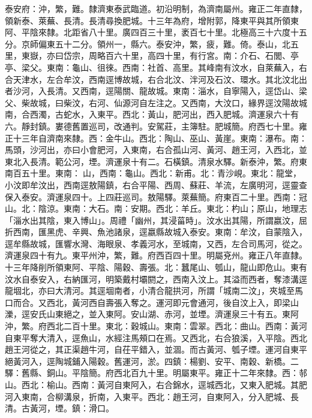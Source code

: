 \begin{pinyinscope}
泰安府：沖，繁，難。隸濟東泰武臨道。初沿明制，為濟南屬州。雍正二年直隸，領新泰、萊蕪、長清。長清尋換肥城。十三年為府，增附郭，降東平與其所領東阿、平陰來隸。北距省八十里。廣四百三十里，袤百七十里。北極高三十六度十五分。京師偏東五十二分。領州一，縣六。泰安沖，繁，疲，難。倚。泰山，北五里，東嶽，亦曰岱宗，周略百六十里，高四十里，有行宮。南：介石、石閭、亭亭、梁父。東南：龜山、徂徠。西南：社首、高里。其峰南有汶水，自萊蕪入，右合天津水，左合牟汶，西南逕博故城，右合北汶、泮河及石汶、環水。其北汶北出者沙河，入長清。又西南，逕陽關、龍故城。東南：淄水，自寧陽入，逕岱山、梁父、柴故城，曰柴汶，右河、仙源河自左注之。又西南，大汶口，緣界逕汶陽故城南，合西濁，古蛇水，入東平。西北：黃山，肥河出，西入肥城。濟運泉六十有六。靜封鎮。婁德舊置巡司，改通判。安駕莊，主簿駐。肥城簡。府西七十里。雍正十三年自濟南來隸。西：金牛山。西北：陶山、巫山、黃崖。東南：瀑布。南：馬頭，沙河出，亦曰小會肥河，入東南，右合孤山河、黃河、趙王河，入西北，並東北入長清。範公河，堙。濟運泉十有二。石橫鎮。清泉水驛。新泰沖，繁。府東南百五十里。東南：山，西南：龜山。西北：新甫。北：青沙峴。東北：龍堂，小汶即牟汶出，西南逕敖陽鎮，右合平陽、西周、蘇莊、羊流，左廣明河，逕靈查保入泰安。濟運泉四十。上四莊巡司。敖陽驛。萊蕪簡。府東百二十里。西南：冠山。北：陰涼。東南：大石。南：安期。西北：羊丘。東北：杓山；原山，地理志「淄水出其陰，東入博山」。周禮「幽州，其浸菑時」。汶水出其陽，所謂嬴汶，屈折西南，匯黑虎、辛興、魚池諸泉，逕嬴縣故城入泰安。東南：牟汶，自蒙陰入，逕牟縣故城，匯響水灣、海眼泉、孝義河水，至城南，又西，左合司馬河，從之。濟運泉四十有九。東平州沖，繁，難。府西百四十里。明屬兗州。雍正八年直隸。十三年降削所領東阿、平陰、陽穀、壽張。北：蠶尾山、瓠山，龍山即危山。東有汶水自泰安入，右納匯河，明築戴村壩閼之，西南入汶上。其溢而西者，奪漆溝逕龍堌北，亦曰大清河。其逕堌南者，小清合龍拱河，所謂「城南二汶」，夾城至馬口而合。又西北，黃河西自壽張入奪之。運河即元會通河，後自汶上入，即梁山濼，逕安氏山東絕之，並入東阿。安山湖、赤河，並堙。濟運泉三十有五。東阿沖，繁。府西北二百十里。東北：穀城山。東南：雲翠。西北：曲山。西南：黃河自東平奪大清入，逕魚山，水經注馬頰口在焉。又西北，右合狼溪，入平陰。西北趙王河從之，其正渠趙牛河，自茌平錯入，並涸。而古黃河、瓠子堙。運河自東平絕黃河入，逕陶城鋪入陽穀。舊運河，淤。四鎮：楊劉、安平、南穀、新橋。二驛：舊縣、銅山。平陰簡。府西北百九十里。明屬東平。雍正十二年來隸。西：邿山。西北：榆山。西南：黃河自東阿入，右合錦水，逕城西北，又東入肥城。其肥河入東南，合柳溝泉，折南，入東平。西北：趙王河，自東阿入，分入肥城、長清。古黃河，堙。鎮：滑口。


\end{pinyinscope}

